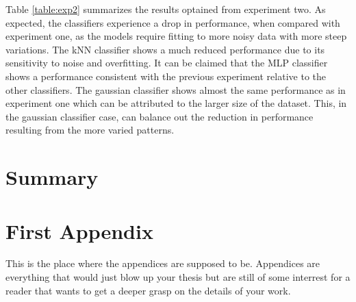 \documentclass[12pt, a4paper, fleqn]{memoir}%
\begin{document}
Table \ref{table:exp2} summarizes the results optained from experiment two. As expected, the classifiers experience a drop in performance, when compared with experiment one, as the models require fitting to more noisy data with more steep variations. The kNN classifier shows a much reduced performance due to its sensitivity to noise and overfitting. It can be claimed that the MLP classifier shows a performance consistent with the previous experiment relative to the other classifiers. The gaussian classifier shows almost the same performance as in experiment one which can be attributed to the larger size of the dataset. This, in the gaussian classifier case, can balance out the reduction in performance resulting from the more varied patterns. 
\chapter{Summary}

{\small}

\appendix
\appendixpage*

\chapter{First Appendix}
\label{app:FirstAppendix}
This is the place where the appendices are supposed to be. Appendices are everything that would just blow up your thesis but are still of some interrest for a reader that wants to get a deeper grasp on the details of your work. 

\backmatter
\end{document}
